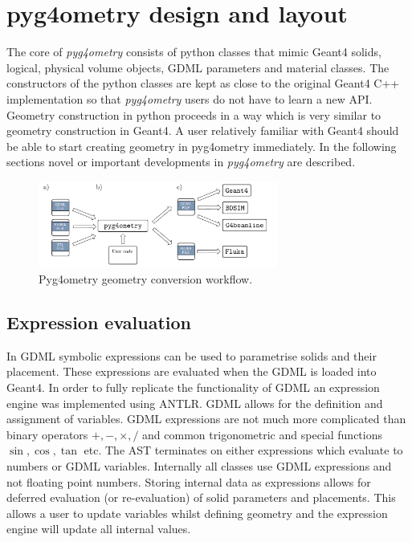 \documentclass[final,5p,times,twocolumn]{elsarticle}
\begin{document}
\section{pyg4ometry design and layout}
The core of {\em pyg4ometry} consists of python classes that mimic Geant4 solids, logical, physical volume objects, GDML parameters and material classes.
The constructors of the python classes are kept as close to the original Geant4 C++ implementation so that {\it pyg4ometry} users do not have to learn 
a new API. Geometry construction in python proceeds in a way which is very similar to geometry construction in Geant4. A user relatively familiar with Geant4
should be able to start creating geometry in pyg4ometry immediately. In the following sections novel or important developments in {\it pyg4ometry} are described.  

\begin{figure}[hbt]
  \normalsize
  \centering
  \includegraphics[width=0.7\textwidth]{./diagrams/workflow.pdf}
  \caption{\label{fig:workflow}Pyg4ometry geometry conversion workflow.}
\end{figure}

    
\subsection{Expression evaluation}
In GDML symbolic expressions can be used to parametrise solids and their placement. These expressions are evaluated when the GDML is loaded into Geant4. 
In order to fully replicate the functionality of GDML an expression engine was implemented using ANTLR. GDML allows for the definition and assignment of 
variables. GDML expressions are not much more complicated than binary operators $+, -, \times, /$ and common trigonometric and special functions $\sin, \cos, \tan$ etc. 
The AST terminates on either expressions which evaluate to numbers or GDML variables. Internally all classes use GDML expressions and not floating point numbers. 
Storing internal data as expressions allows for deferred evaluation (or re-evaluation) of solid parameters and placements. This allows a user to update variables whilst
defining geometry and the expression engine will update all internal values.  
 
\end{document}
